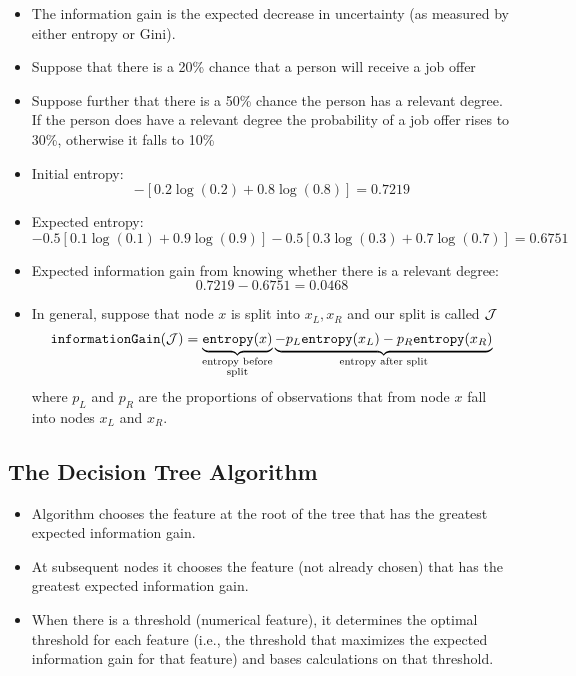 \begin{itemize}
    \item The information gain is the expected decrease in uncertainty (as measured by either entropy or Gini).
    \item Suppose that there is a 20\% chance that a person will receive a job offer
    \item Suppose further that there is a 50\% chance the person has a relevant degree. If the person does have a relevant degree the probability of a job offer rises to 30\%, otherwise it falls to 10\%
    \item Initial entropy:
    \begin{equation*}
        -[ 0.2\log(0.2) +0.8\log(0.8)] =0.7219
    \end{equation*}
    \item Expected entropy:
    \begin{equation*}
        -0.5\left[ 0.1\log\left(0.1\right) +0.9\log\left(0.9\right)\right] -0.5\left[ 0.3\log\left(0.3\right) +0.7\log\left(0.7\right)\right] = 0.6751
    \end{equation*}
    \item Expected information gain from knowing whether there is a relevant degree:
    \begin{equation*}
        0.7219-0.6751=0.0468
    \end{equation*}
    \item In general, suppose that node $x$ is split into $x_{L},x_{R}$ and our split is called $\mathcal{J}$
    \[
        \texttt{informationGain}(\mathcal{J}) = \underbrace{\texttt{entropy}(x)}_{\substack{\text{entropy before}\\\text{split}}} \underbrace{- p_{L} \texttt{entropy}(x_{L}) - p_{R} \texttt{entropy}(x_{R})}_{\text{entropy after split}}
    \]
    where $p_{L}$ and $p_{R}$ are the proportions of observations that from node $x$ fall into nodes $x_{L}$ and $x_{R}$.
\end{itemize}

\subsection{The Decision Tree Algorithm}

\begin{itemize}
    \item Algorithm chooses the feature at the root of the tree that has the greatest expected information gain.
    \item At subsequent nodes it chooses the feature (not already chosen) that has the greatest expected information gain.
    \item When there is a threshold (numerical feature), it determines the optimal threshold for each feature (i.e., the threshold that maximizes the expected information gain for that feature) and bases calculations on that threshold.
\end{itemize}


